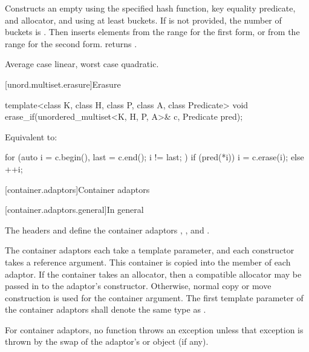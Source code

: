 \begin{itemdescr}
\pnum
\effects
Constructs an empty  using the
specified hash function, key equality predicate, and allocator, and
using at least  buckets. If  is not
provided, the number of buckets is . Then
inserts elements from the range 
for the first form, or from the range
 for the second form.
 returns .

\pnum
\complexity
Average case linear, worst case quadratic.
\end{itemdescr}

[unord.multiset.erasure]{Erasure}

%
\begin{itemdecl}
template<class K, class H, class P, class A, class Predicate>
  void erase_if(unordered_multiset<K, H, P, A>& c, Predicate pred);
\end{itemdecl}

\begin{itemdescr}
\pnum
\effects
Equivalent to:
\begin{codeblock}
for (auto i = c.begin(), last = c.end(); i != last; ) {
  if (pred(*i)) {
    i = c.erase(i);
  } else {
    ++i;
  }
}
\end{codeblock}
\end{itemdescr}

[container.adaptors]{Container adaptors}

[container.adaptors.general]{In general}

\pnum
The headers  and  define the container adaptors
, , and .

\pnum
The container adaptors each take a  template parameter, and each constructor takes
a  reference argument. This container is copied into the  member
of each adaptor. If the container takes an allocator, then a compatible allocator may be passed in
to the adaptor's constructor. Otherwise, normal copy or move construction is used for the container
argument.
The first template parameter  of the container adaptors
shall denote the same type as .

\pnum
For container adaptors, no  function throws an exception unless that
exception is thrown by the swap of the adaptor's  or
 object (if any).

